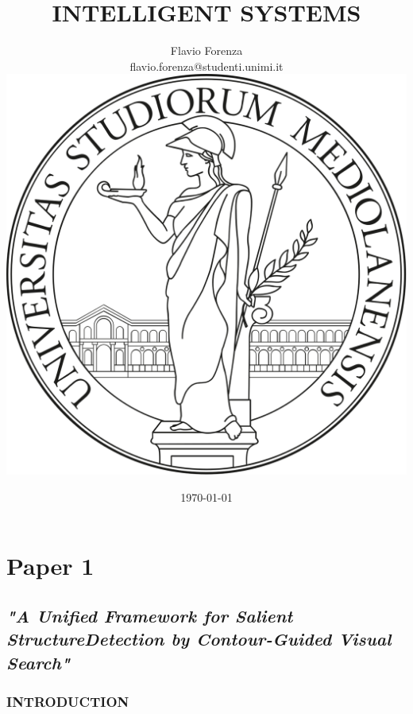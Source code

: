 \documentclass{beamer}
\title[short]{INTELLIGENT SYSTEMS}
\author[Flavio Forenza]{Flavio Forenza \\ \tiny flavio.forenza@studenti.unimi.it\\[5mm] \includegraphics[scale = 0.06]{logoUnimi2.png}}
\institute{Department of Computer Science,\\ University of Milan, Italy}
\date{\tiny \today}
\begin{document}
\begin{frame}
    \maketitle
\end{frame}


\section{Paper 1}
\subsection{\emph{"A Unified Framework for Salient StructureDetection by Contour-Guided Visual Search"}}
\begin{frame}
    \frametitle{INTRODUCTION}
    
\end{frame}





    
\end{document}
